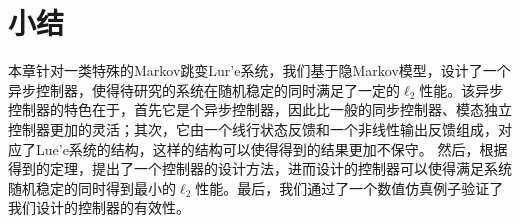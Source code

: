 \section{小结}
	本章针对一类特殊的Markov跳变Lur'e系统，我们基于隐Markov模型，设计了一个异步控制器，使得待研究的系统在随机稳定的同时满足了一定的$\ell_2$性能。该异步控制器的特色在于，首先它是个异步控制器，因此比一般的同步控制器、模态独立控制器更加的灵活；其次，它由一个线行状态反馈和一个非线性输出反馈组成，对应了Lue'e系统的结构，这样的结构可以使得得到的结果更加不保守。 然后，根据得到的定理，提出了一个控制器的设计方法，进而设计的控制器可以使得满足系统随机稳定的同时得到最小的$\ell_2$性能。最后，我们通过了一个数值仿真例子验证了我们设计的控制器的有效性。